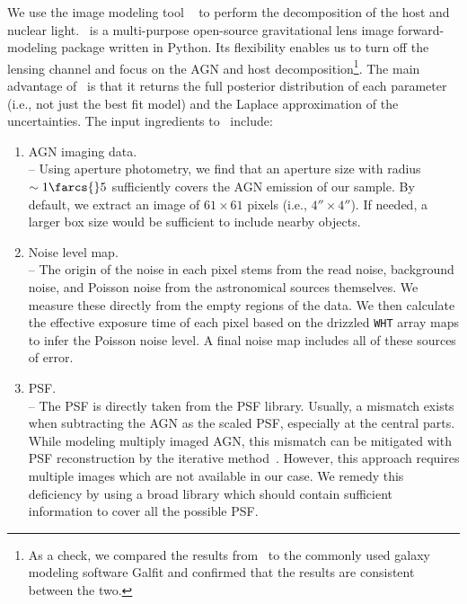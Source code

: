 \documentclass[apj]{emulateapj}
\begin{document}
We use the image modeling tool \lenstronomy~\citep{Birrer2015, lenstronomy} to perform the decomposition of the host and nuclear light. \lenstronomy\ is a multi-purpose open-source gravitational lens image forward-modeling package written in Python. 
Its flexibility enables us to turn off the lensing channel and focus on the AGN and host decomposition\footnote{As a check, we compared the results from \lenstronomy\ to the commonly used galaxy modeling software {\sc Galfit} and confirmed that the results are consistent between the two.}. The main advantage of \lenstronomy\ is that it returns the full posterior distribution of each parameter (i.e., not just the best fit model) and the Laplace approximation of the uncertainties. The input ingredients to \lenstronomy\ include:
\begin{enumerate}
\item AGN imaging data. \\
-- Using aperture photometry, we find that an aperture size with radius $\sim1\farcs{}5$ sufficiently covers the AGN emission of our sample. By default, we extract an image of $61\times61$ pixels (i.e., $4''\times 4''$). If needed, a larger box size would be sufficient to include nearby objects. 
\item Noise level map.\\
-- The origin of the noise in each pixel stems from the read noise, background noise, and Poisson noise from the astronomical sources themselves. We measure these directly from the empty regions of the data. We then calculate the effective exposure time of each pixel based on the drizzled \texttt{WHT} array maps to infer the Poisson noise level. A final noise map includes all of these sources of error. 
  
\item PSF. \\
-- The PSF is directly taken from the PSF library. Usually, a mismatch exists when subtracting the AGN as the scaled PSF, especially at the central parts. While modeling multiply imaged AGN, this mismatch can be mitigated with PSF reconstruction by the iterative method~\citep{Chen2016, Birrer2018}.  However, this approach requires multiple images which are not available in our case.  We remedy this deficiency by using a broad library which should contain sufficient information to cover all the possible PSF. 
\end{enumerate}

\end{document}
